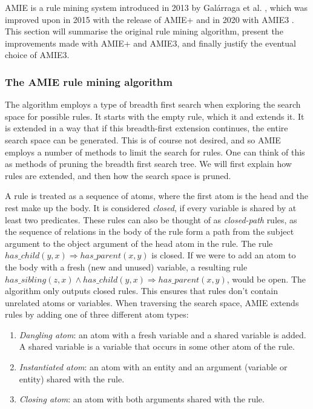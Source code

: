 AMIE is a rule mining system introduced in 2013 by Galárraga et al. \cite{amie}, which was improved upon in 2015 with the release of AMIE+ \cite{amie_plus} and in 2020 with AMIE3 \cite{amie3}. This section will summarise the original rule mining algorithm, present the improvements made with AMIE+ and AMIE3, and finally justify the eventual choice of AMIE3.

\subsubsection{The AMIE rule mining algorithm}
The algorithm employs a type of breadth first search when exploring the search space for possible rules. It starts with the empty rule, which it and extends it. It is extended in a way that if this breadth-first extension continues, the entire search space can be generated. This is of course not desired, and so AMIE employs a number of methods to limit the search for rules. One can think of this as methods of pruning the breadth first search tree. We will first explain how rules are extended, and then how the search space is pruned.

A rule is treated as a sequence of atoms, where the first atom is the head and the rest make up the body. It is considered \textit{closed}, if every variable is shared by at least two predicates. These rules can also be thought of as \textit{closed-path} rules, as the sequence of relations in the body of the rule form a path from the subject argument to the object argument of the head atom in the rule. The rule $has\_child(y, x) \Rightarrow has\_parent(x, y)$ is closed. If we were to add an atom to the body with a fresh (new and unused) variable, a resulting rule $has\_sibling(z, x) \wedge has\_child(y, x) \Rightarrow has\_parent(x, y)$, would be open. The algorithm only outputs closed rules. This ensures that rules don't contain unrelated atoms or variables. When traversing the search space, AMIE extends rules by adding one of three different atom types:
\begin{enumerate}
    \item \textit{Dangling atom}: an atom with a fresh variable and a shared variable is added. A shared variable is a variable that occurs in some other atom of the rule.
    \item \textit{Instantiated atom}: an atom with an entity and an argument (variable or entity) shared with the rule.
    \item \textit{Closing atom}: an atom with both arguments shared with the rule.
\end{enumerate}

